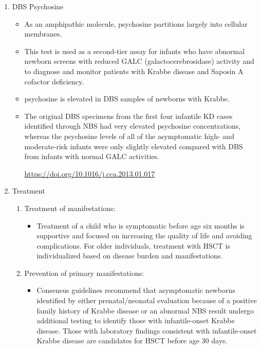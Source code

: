 \documentclass{scrartcl}
\begin{document}
\begin{enumerate}
\begin{enumerate}
\item DBS Psychosine
\label{sec:org352034d}
\begin{itemize}
\item As an amphipathic molecule, psychosine partitions largely into
cellular membranes.
\item This test is used as a second-tier assay for infants who have
abnormal newborn screens with reduced GALC (galactocerebrosidase)
activity and to diagnose and monitor patients with Krabbe disease
and Saposin A cofactor deficiency.

\item psychosine is elevated in DBS samples of newborns with Krabbe.

\item The original DBS specimens from the first four infantile
KD cases identified through NBS had very elevated psychosine
concentrations, whereas the psychosine levels of all of the
asymptomatic high- and moderate-risk infants were only slightly
elevated compared with DBS from infants with normal GALC activities.

\url{https://doi.org/10.1016/j.cca.2013.01.017}
\end{itemize}


\item Treatment
\label{sec:orgf60b6a5}

\begin{enumerate}
\item Treatment of manifestations:
\label{sec:org4e4e54a}
\begin{itemize}
\item Treatment of a child who is symptomatic before age six months is
supportive and focused on increasing the quality of life and
avoiding complications. For older individuals, treatment with HSCT
is individualized based on disease burden and manifestations.
\end{itemize}

\item Prevention of primary manifestations:
\label{sec:org23eed0f}
\begin{itemize}
\item Consensus guidelines recommend that asymptomatic newborns
identified by either prenatal/neonatal evaluation because of a
positive family history of Krabbe disease or an abnormal NBS
result undergo additional testing to identify those with
infantile-onset Krabbe disease. Those with laboratory findings
consistent with infantile-onset Krabbe disease are candidates for
HSCT before age 30 days.
\end{itemize}


\end{enumerate}
\end{enumerate}
\end{enumerate}
\end{document}
